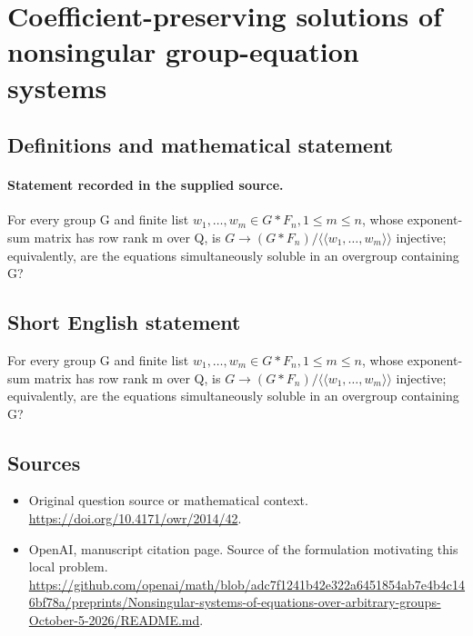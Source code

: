 \documentclass[11pt]{article}
\begin{document}
\section*{Coefficient-preserving solutions of nonsingular group-equation systems}\label{statement}
\subsection{Definitions and mathematical statement}
\paragraph{Statement recorded in the supplied source.}
For every group G and finite list $w_{1},\dots ,w_m\in G*F_n,1\leq m\leq n$, whose exponent-sum matrix has row rank m over Q, is $G\to (G*F_n)/\langle \langle w_{1},\dots ,w_m\rangle \rangle $ injective; equivalently, are the equations simultaneously soluble in an overgroup containing G?
\subsection{Short English statement}
For every group G and finite list $w_{1},\dots ,w_m\in G*F_n,1\leq m\leq n$, whose exponent-sum matrix has row rank m over Q, is $G\to (G*F_n)/\langle \langle w_{1},\dots ,w_m\rangle \rangle $ injective; equivalently, are the equations simultaneously soluble in an overgroup containing G?
\subsection{Sources}
\begin{itemize}
\item[S1] Original question source or mathematical context.
\url{https://doi.org/10.4171/owr/2014/42}.
\item[S2] OpenAI, manuscript citation page. Source of the formulation motivating this local problem.
\url{https://github.com/openai/math/blob/adc7f1241b42e322a6451854ab7e4b4c146bf78a/preprints/Nonsingular-systems-of-equations-over-arbitrary-groups-October-5-2026/README.md}.
\end{itemize}
\end{document}
